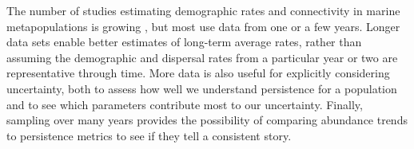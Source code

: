\documentclass[12pt, oneside]{article}   	%
\begin{document}

The number of studies estimating demographic rates and connectivity in marine metapopulations is growing \citep[e.g.][]{salles_coral_2015, johnson2018integrating, garavelli2018population}, but most use data from one or a few years. Longer data sets enable better estimates of long-term average rates, rather than assuming the demographic and dispersal rates from a particular year or two are representative through time. More data is also useful for explicitly considering uncertainty, both to assess how well we understand persistence for a population and to see which parameters contribute most to our uncertainty. Finally, sampling over many years provides the possibility of comparing abundance trends to persistence metrics to see if they tell a consistent story.

\end{document}
